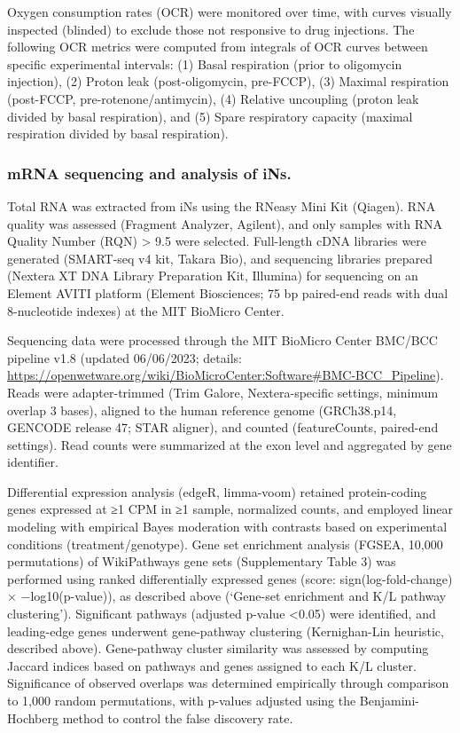 Oxygen consumption rates (OCR) were monitored over time, with curves visually inspected (blinded) to exclude those not responsive to drug injections. The following OCR metrics were computed from integrals of OCR curves between specific experimental intervals: (1) Basal respiration (prior to oligomycin injection), (2) Proton leak (post-oligomycin, pre-FCCP), (3) Maximal respiration (post-FCCP, pre-rotenone/antimycin), (4) Relative uncoupling (proton leak divided by basal respiration), and (5) Spare respiratory capacity (maximal respiration divided by basal respiration).


\subsubsection{mRNA sequencing and analysis of iNs.}
Total RNA was extracted from iNs using the RNeasy Mini Kit (Qiagen). RNA quality was assessed (Fragment Analyzer, Agilent), and only samples with RNA Quality Number (RQN) > 9.5 were selected. Full-length cDNA libraries were generated (SMART-seq v4 kit, Takara Bio), and sequencing libraries prepared (Nextera XT DNA Library Preparation Kit, Illumina) for sequencing on an Element AVITI platform (Element Biosciences; 75 bp paired-end reads with dual 8-nucleotide indexes) at the MIT BioMicro Center.

Sequencing data were processed through the MIT BioMicro Center BMC/BCC pipeline v1.8 (updated 06/06/2023; details: \url{https://openwetware.org/wiki/BioMicroCenter:Software\#BMC-BCC_Pipeline}). Reads were adapter-trimmed (Trim Galore, Nextera-specific settings, minimum overlap 3 bases), aligned to the human reference genome (GRCh38.p14, GENCODE release 47; STAR aligner), and counted (featureCounts, paired-end settings). Read counts were summarized at the exon level and aggregated by gene identifier.

Differential expression analysis (edgeR, limma-voom) retained protein-coding genes expressed at ≥1 CPM in ≥1 sample, normalized counts, and employed linear modeling with empirical Bayes moderation with contrasts based on experimental conditions (treatment/genotype). Gene set enrichment analysis (FGSEA, 10,000 permutations) of WikiPathways gene sets (Supplementary Table 3) was performed using ranked differentially expressed genes (score: sign(log-fold-change) × −log10(p-value)), as described above (‘Gene-set enrichment and K/L pathway clustering’). Significant pathways (adjusted p-value <0.05) were identified, and leading-edge genes underwent gene-pathway clustering (Kernighan-Lin heuristic, described above).
Gene-pathway cluster similarity was assessed by computing Jaccard indices based on pathways and genes assigned to each K/L cluster. Significance of observed overlaps was determined empirically through comparison to 1,000 random permutations, with p-values adjusted using the Benjamini-Hochberg method to control the false discovery rate.

